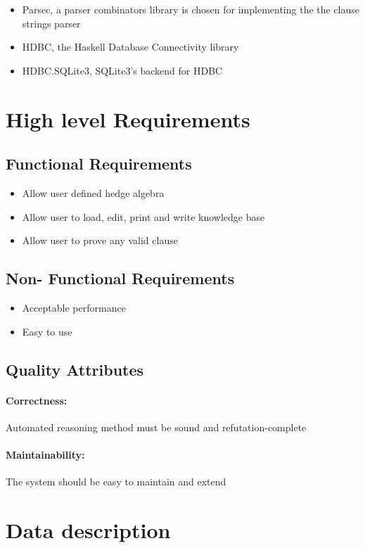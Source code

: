 \documentclass[26pt,fleqn,]{article}
\begin{document}
\begin{itemize}
\item Parsec, a parser combinators library is chosen for implementing the the clause strings parser
\item HDBC, the Haskell Database Connectivity library
\item HDBC.SQLite3, SQLite3's backend for HDBC
\end{itemize}

\section{High level Requirements}
\subsection{Functional Requirements}
\begin{itemize}
\item Allow user defined hedge algebra
\item Allow user to load, edit, print and write knowledge base 
\item Allow user to prove any valid clause
\end{itemize}

\subsection{Non- Functional Requirements}
\begin{itemize}
\item Acceptable performance
\item Easy to use
\end{itemize}

\subsection{Quality Attributes}

\paragraph{Correctness:}
Automated reasoning method must be sound and refutation-complete

\paragraph{Maintainability:}
The system should be easy to maintain and extend
\section{Data description}
\end{document}
